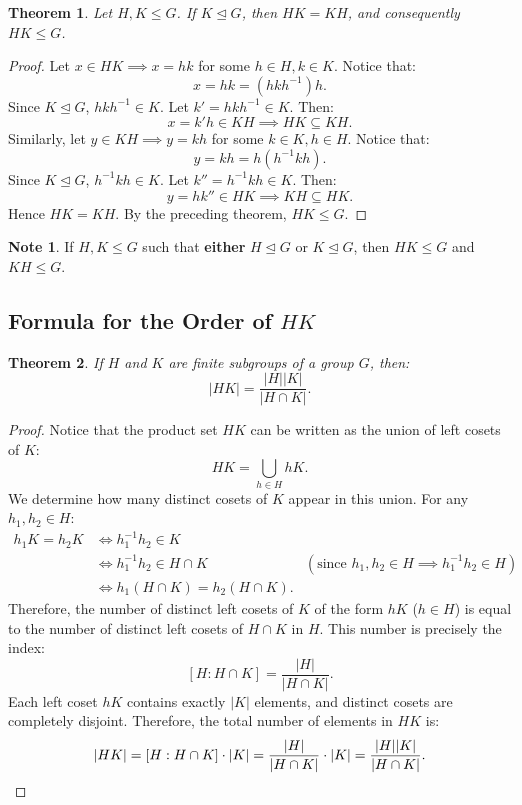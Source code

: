 \documentclass[12pt]{article}
\theoremstyle{definition}
\newtheorem*{note}{Note}
\theoremstyle{plain}
\newtheorem{theorem}{Theorem}[section]
\begin{document}
\begin{theorem}
Let $H, K \le G$. If $K \trianglelefteq G$, then $HK = KH$, and consequently $HK \le G$.
\end{theorem}

\begin{proof}
Let $x \in HK \implies x = hk$ for some $h \in H, k \in K$.
Notice that:
\[
x = hk = (h k h^{-1}) h.
\]
Since $K \trianglelefteq G$, $h k h^{-1} \in K$. Let $k' = h k h^{-1} \in K$. Then:
\[
x = k' h \in KH \implies HK \subseteq KH.
\]
Similarly, let $y \in KH \implies y = kh$ for some $k \in K, h \in H$.
Notice that:
\[
y = kh = h (h^{-1} k h).
\]
Since $K \trianglelefteq G$, $h^{-1} k h \in K$. Let $k'' = h^{-1} k h \in K$. Then:
\[
y = h k'' \in HK \implies KH \subseteq HK.
\]
Hence $HK = KH$. By the preceding theorem, $HK \le G$.
\end{proof}

\begin{note}
If $H, K \le G$ such that \textbf{either} $H \trianglelefteq G$ or $K \trianglelefteq G$, then $HK \le G$ and $KH \le G$.
\end{note}

\subsection{Formula for the Order of \texorpdfstring{$HK$}{HK}}

\begin{theorem}
If $H$ and $K$ are finite subgroups of a group $G$, then:
\[
|HK| = \frac{|H||K|}{|H \cap K|}.
\]
\end{theorem}

\begin{proof}
Notice that the product set $HK$ can be written as the union of left cosets of $K$:
\[
HK = \bigcup_{h \in H} hK.
\]
We determine how many distinct cosets of $K$ appear in this union.
For any $h_1, h_2 \in H$:
\begin{align*}
h_1 K = h_2 K &\iff h_1^{-1} h_2 \in K \\
&\iff h_1^{-1} h_2 \in H \cap K & (\text{since } h_1, h_2 \in H \implies h_1^{-1}h_2 \in H) \\
&\iff h_1 (H \cap K) = h_2 (H \cap K).
\end{align*}
Therefore, the number of distinct left cosets of $K$ of the form $hK$ ($h \in H$) is equal to the number of distinct left cosets of $H \cap K$ in $H$.
This number is precisely the index:
\[
[H : H \cap K] = \frac{|H|}{|H \cap K|}.
\]
Each left coset $hK$ contains exactly $|K|$ elements, and distinct cosets are completely disjoint.
Therefore, the total number of elements in $HK$ is:
\[
|HK| = [H : H \cap K] \cdot |K| = \frac{|H|}{|H \cap K|} \cdot |K| = \frac{|H||K|}{|H \cap K|}. \qedhere
\]
\end{proof}
\end{document}
